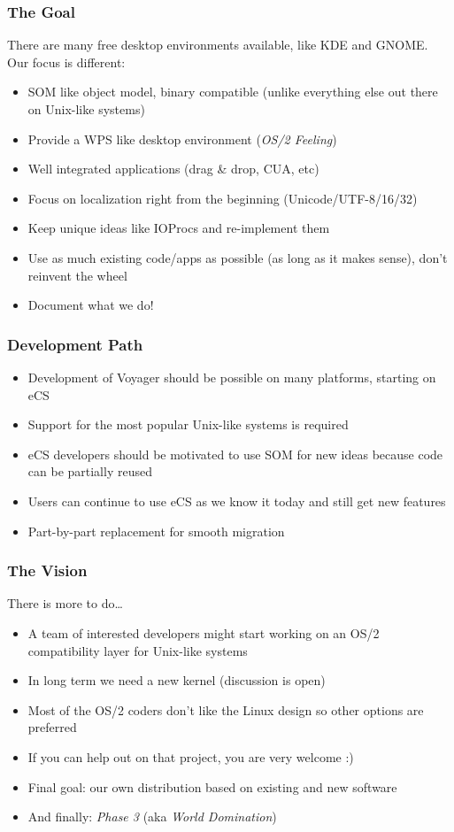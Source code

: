 \documentclass{beamer}
\begin{document}
\begin{frame}
\frametitle{The Goal}
There are many free desktop environments available, like KDE and GNOME. Our focus is different:
\begin{itemize}[<+->]
  \item SOM like object model, binary compatible (unlike everything else out
  there on Unix-like systems)
  \item Provide a WPS like desktop environment (\textit{OS/2 Feeling})
  \item Well integrated applications (drag \& drop, CUA, etc)
  \item Focus on localization right from the beginning (Unicode/UTF-8/16/32)
  \item Keep unique ideas like IOProcs and re-implement them
  \item Use as much existing code/apps as possible (as long as it makes sense),
  don't reinvent the wheel 
  \item Document what we do!
\end{itemize}
\end{frame}

\begin{frame}
\frametitle{Development Path}
\begin{itemize}[<+->]
  \item Development of Voyager should be possible on many platforms, starting on
  eCS
  \item Support for the most popular Unix-like systems is required
  \item eCS developers should be motivated to use SOM for new ideas because
  code can be partially reused
  \item Users can continue to use eCS as we know it today and still get new features
  \item Part-by-part replacement for smooth migration
\end{itemize}
\end{frame}

\begin{frame}
\frametitle{The Vision}
There is more to do\ldots
\begin{itemize}[<+->]
  \item A team of interested developers might start working on an OS/2 compatibility layer for Unix-like systems
  \item In long term we need a new kernel (discussion is open)
  \item Most of the OS/2 coders don't like the Linux design so other options are preferred
  \item If you can help out on that project, you are very welcome :)
  \item Final goal: our own distribution based on existing and new software
  \item And finally: \textit{Phase 3} (aka \textit{World Domination\texttrademark})
\end{itemize}
\end{frame}
\end{document}
